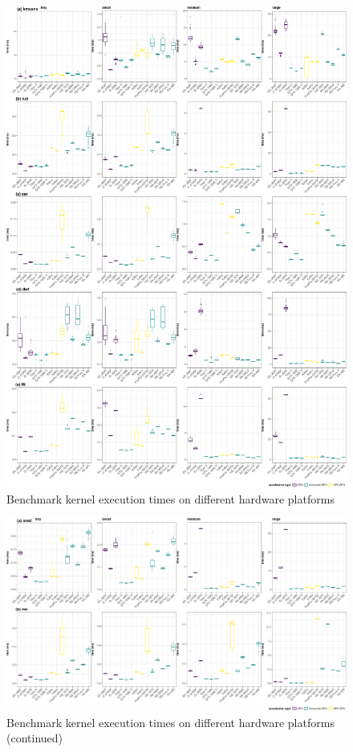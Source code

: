 \documentclass[../document.tex]{subfiles}
\begin{document}
\begin{figure}
    \centering
    \includegraphics[height=0.96\textheight,width=\textwidth,keepaspectratio]{figures/new-time-results/generate_main_4x5_bandwplot}
    \caption{Benchmark kernel execution times on different hardware platforms}
    \label{fig:time}
\end{figure}

\begin{figure}[t]
    \centering
    \includegraphics[width=\textwidth,keepaspectratio]{figures/new-time-results/generate_main_4x2_bandwplot}
    \caption{Benchmark kernel execution times on different hardware platforms (continued)}
    \label{fig:time2}
\end{figure}
\end{document}
